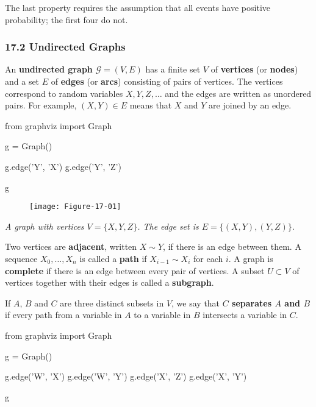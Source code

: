The last property requires the assumption that all events have positive
probability; the first four do not.

\subsubsection{17.2 Undirected Graphs}\label{undirected-graphs}

An \textbf{undirected graph} \(\mathcal{G} = (V, E)\) has a finite set
\(V\) of \textbf{vertices} (or \textbf{nodes}) and a set \(E\) of
\textbf{edges} (or \textbf{arcs}) consisting of pairs of vertices. The
vertices correspond to random variables \(X, Y, Z, \dots\) and the edges
are written as unordered pairs. For example, \((X, Y) \in E\) means that
\(X\) and \(Y\) are joined by an edge.

\begin{python}
from graphviz import Graph

g = Graph()

g.edge('Y', 'X')
g.edge('Y', 'Z')

g
\end{python}

\begin{figure}[H]
\texttt{[image: Figure-17-01]}
\end{figure}

\emph{A graph with vertices \(V = \{X, Y, Z\}\). The edge set is
\(E = \{(X, Y), (Y, Z)\}\).}

Two vertices are \textbf{adjacent}, written \(X \sim Y\), if there is an
edge between them. A sequence \(X_0, \dots, X_n\) is called a
\textbf{path} if \(X_{i-1} \sim X_i\) for each \(i\). A graph is
\textbf{complete} if there is an edge between every pair of vertices. A
subset \(U \subset V\) of vertices together with their edges is called a
\textbf{subgraph}.

If \(A\), \(B\) and \(C\) are three distinct subsets in \(V\), we say
that \textbf{\(C\) separates \(A\) and \(B\)} if every path from a
variable in \(A\) to a variable in \(B\) intersects a variable in \(C\).

\begin{python}
from graphviz import Graph

g = Graph()

g.edge('W', 'X')
g.edge('W', 'Y')
g.edge('X', 'Z')
g.edge('X', 'Y')

g
\end{python}

